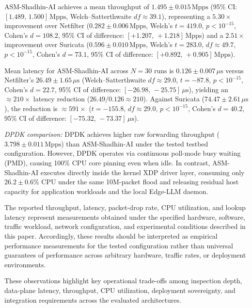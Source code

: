 \documentclass{ieeeaccess}
\renewcommand{\_}{\textunderscore\allowbreak}
\begin{document}
ASM-Shadhin-AI achieves a mean throughput of $1.495 \pm 0.015\,\text{Mpps}$
(95\% CI: $[1.489,\, 1.500]\,\text{Mpps}$, Welch--Satterthwaite
$\mathit{df} \approx 39.1$), representing a $5.30\times$
improvement over Netfilter ($0.282 \pm 0.006\,\text{Mpps}$, Welch's $t = 419.0$,
$p < 10^{-15}$, Cohen's $d = 108.2$, 95\% CI of difference: $[+1.207,\, +1.218]\,\text{Mpps}$) and a $2.51\times$
improvement over Suricata ($0.596 \pm 0.010\,\text{Mpps}$, Welch's $t = 283.0$,
$\mathit{df} \approx 49.7$, $p < 10^{-15}$, Cohen's $d = 73.1$, 95\% CI of difference: $[+0.892,\, +0.905]\,\text{Mpps}$).

Mean latency for ASM-Shadhin-AI across $N=30$ runs is
$0.126 \pm 0.007\,\mu\text{s}$ versus Netfilter's $26.49 \pm 1.65\,\mu\text{s}$
(Welch--Satterthwaite $\mathit{df} \approx 29.0$, $t = -87.8$, $p < 10^{-15}$, Cohen's $d = 22.7$,
95\% CI of difference: $[-26.98,\, -25.75]\,\mu\text{s}$), yielding an
$\approx\!210\times$ latency reduction ($26.49 / 0.126 \approx 210$).
Against Suricata ($74.47 \pm 2.61\,\mu\text{s}$), the reduction is $\approx\!591\times$
($t = -155.8$, $\mathit{df} \approx 29.0$, $p < 10^{-15}$, Cohen's $d = 40.2$,
95\% CI of difference: $[-75.32,\, -73.37]\,\mu\text{s}$).

\textit{DPDK comparison:} DPDK achieves higher raw forwarding throughput
($3.798 \pm 0.011\,\text{Mpps}$) than ASM-Shadhin-AI under the tested testbed
configuration. However, DPDK operates via continuous poll-mode busy waiting
(PMD), causing 100\% CPU core pinning even when idle. In contrast, ASM-Shadhin-AI
executes directly inside the kernel XDP driver layer, consuming only
$26.2 \pm 0.6\%$ CPU under the same 10M-packet flood and releasing residual
host capacity for application workloads and the local Edge-LLM daemon.

The reported throughput, latency, packet-drop rate, CPU utilization, and lookup
latency represent measurements obtained under the specified hardware, software,
traffic workload, network configuration, and experimental conditions described in
this paper. Accordingly, these results should be interpreted as empirical
performance measurements for the tested configuration rather than universal
guarantees of performance across arbitrary hardware, traffic rates, or deployment
environments.

These observations highlight key operational trade-offs among inspection depth,
data-plane latency, throughput, CPU utilization, deployment sovereignty, and
integration requirements across the evaluated architectures.
\end{document}
